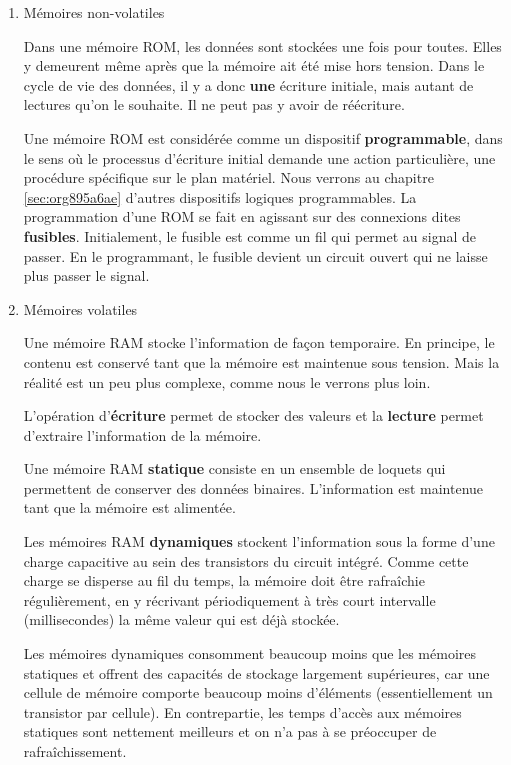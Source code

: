\documentclass[letter, oneside]{book}
\begin{document}
\begin{enumerate}
\item Mémoires non-volatiles
\label{sec:org30c5402}

Dans une mémoire ROM, les données sont stockées une fois pour
toutes. Elles y demeurent même après que la mémoire ait été mise hors
tension. Dans le cycle de vie des données, il y a donc \textbf{une} écriture
initiale, mais autant de lectures qu'on le souhaite. Il ne peut pas y
avoir de réécriture.

Une mémoire ROM est considérée comme un dispositif \textbf{programmable},
dans le sens où le processus d'écriture initial demande une action
particulière, une procédure spécifique sur le plan matériel. Nous verrons
au chapitre \ref{sec:org895a6ae} d'autres dispositifs logiques
programmables. La programmation d'une ROM se fait en agissant sur des
connexions dites \textbf{fusibles}. Initialement, le fusible est comme un fil
qui permet au signal de passer. En le programmant, le fusible devient
un circuit ouvert qui ne laisse plus passer le signal.

\item Mémoires volatiles
\label{sec:orgf6f7eb3}

Une mémoire RAM stocke l'information de façon temporaire. En principe,
le contenu est conservé tant que la mémoire est maintenue sous
tension. Mais la réalité est un peu plus complexe, comme nous le verrons
plus loin.

L'opération d'\textbf{écriture} permet de stocker des valeurs et la
\textbf{lecture} permet d'extraire l'information de la mémoire.

Une mémoire RAM \textbf{statique} consiste en un ensemble de loquets qui
permettent de conserver des données binaires. L'information est
maintenue tant que la mémoire est alimentée. 

Les mémoires RAM \textbf{dynamiques} stockent l'information sous la forme
d'une charge capacitive au sein des transistors du circuit
intégré. Comme cette charge se disperse au fil du temps, la mémoire
doit être rafraîchie régulièrement, en y récrivant périodiquement à
très court intervalle (millisecondes) la même valeur qui est déjà
stockée.

Les mémoires dynamiques consomment beaucoup moins que les mémoires
statiques et offrent des capacités de stockage largement supérieures,
car une cellule de mémoire comporte beaucoup moins d'éléments
(essentiellement un transistor par cellule). En contrepartie, les
temps d'accès aux mémoires statiques sont nettement meilleurs et on
n'a pas à se préoccuper de rafraîchissement.
\end{enumerate}
\end{document}

